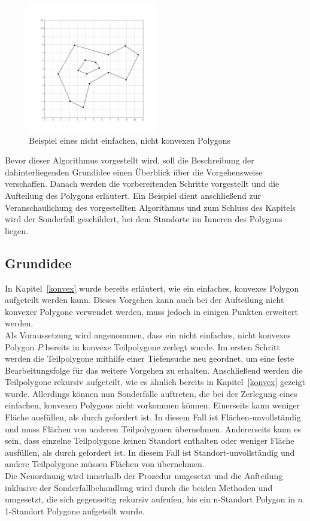 \documentclass[ngerman]{seminarbeitrag}
\begin{document}
\begin{figure}[hb]
    \includegraphics[width=0.50\textwidth]{./Abbildungen/4.png}
    \centering
    \caption{Beispiel eines nicht einfachen, nicht konvexen Polygons}
    \label{viertes beispiel}
\end{figure}
Bevor dieser Algorithmus vorgestellt wird, soll die Beschreibung der dahinterliegenden Grundidee einen Überblick über die Vorgehensweise verschaffen. Danach werden die vorbereitenden Schritte vorgestellt und die Aufteilung des Polygons erläutert. Ein Beispiel dient anschließend zur Veranschaulichung des vorgestellten Algorithmus und zum Schluss des Kapitels wird der Sonderfall geschildert, bei dem Standorte im Inneren des Polygons liegen.

\subsection{Grundidee}\label{grundidee nicht konvex}
In Kapitel~\ref{konvex} wurde bereits erläutert, wie ein einfaches, konvexes Polygon aufgeteilt werden kann. Dieses Vorgehen kann auch bei der Aufteilung nicht konvexer Polygone verwendet werden, muss jedoch in einigen Punkten erweitert werden.\\
Als Voraussetzung wird angenommen, dass ein nicht einfaches, nicht konvexes Polygon $P$ bereits in konvexe Teilpolygone \cpp zerlegt wurde. Im ersten Schritt werden die Teilpolygone mithilfe einer Tiefensuche neu geordnet, um eine feste Bearbeitungsfolge für das weitere Vorgehen zu erhalten. Anschließend werden die Teilpolygone rekursiv aufgeteilt, wie es ähnlich bereits in Kapitel~\ref{konvex} gezeigt wurde. Allerdings können nun Sonderfälle auftreten, die bei der Zerlegung eines einfachen, konvexen Polygons nicht vorkommen können. Einerseits kann \cpi weniger Fläche ausfüllen, als durch gefordert ist. In diesem Fall ist \cpi Flächen-unvollständig und muss Flächen von anderen Teilpolygonen übernehmen. Andererseits kann es sein, dass einzelne Teilpolygone keinen Standort enthalten oder weniger Fläche ausfüllen, als durch gefordert ist. In diesem Fall ist \cpi Standort-unvollständig und andere Teilpolygone müssen Flächen von \cpi übernehmen.\\
Die Neuordnung wird innerhalb der Prozedur \ord umgesetzt und die Aufteilung inklusive der Sonderfallbehandlung wird durch die beiden Methoden \noncon und \daa umgesetzt, die sich gegenseitig rekursiv aufrufen, bis ein n-Standort Polygon in $n$ 1-Standort Polygone aufgeteilt wurde.
\end{document}

